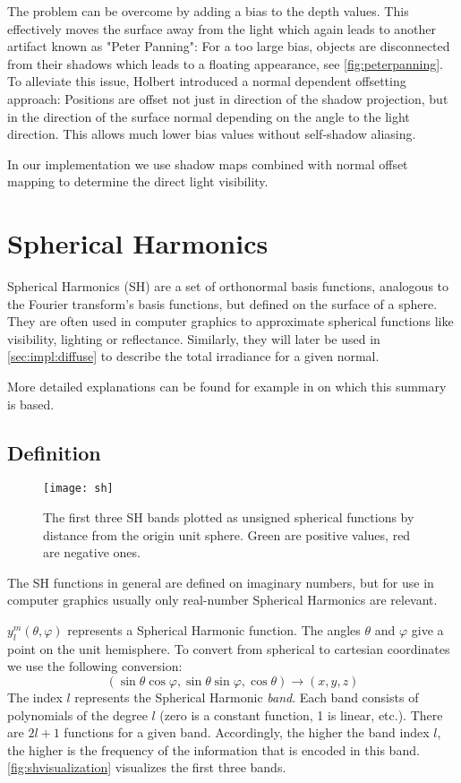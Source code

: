 \documentclass[thesis.tex]{subfiles}
\begin{document}
The problem can be overcome by adding a bias to the depth values.
This effectively moves the surface away from the light which again leads to another artifact known as "Peter Panning":
For a too large bias, objects are disconnected from their shadows which leads to a floating appearance, see \autoref{fig:peterpanning}.
\\
To alleviate this issue, Holbert \cite{bib:normaloffsetshadowmapping} introduced a normal dependent offsetting approach:
Positions are offset not just in direction of the shadow projection, but in the direction of the surface normal depending on the angle to the light direction.
This allows much lower bias values without self-shadow aliasing.

In our implementation we use shadow maps combined with normal offset mapping to determine the direct light visibility.


\section{Spherical Harmonics}\label{sec:preq:sh}
Spherical Harmonics (SH) are a set of orthonormal basis functions, analogous to the Fourier transform's basis functions, but defined on the surface of a sphere.
They are often used in computer graphics to approximate spherical functions like visibility, lighting or reflectance. Similarly, they will later be used in \autoref{sec:impl:diffuse} to describe the total irradiance for a given normal.

More detailed explanations can be found for example in \cite{bib:grittysh, bib:stupidsh} on which this summary is based.

\subsection{Definition} \label{chap:sh:def}
\begin{figure}[h]
	\centering
	\texttt{[image: sh]}
	\caption{\cite{bib:grittysh} The first three SH bands plotted as unsigned spherical functions by distance from the origin unit sphere. Green are positive values, red are negative ones.}
	\label{fig:shvisualization}
\end{figure}
The SH functions in general are defined on imaginary numbers, but for use in computer graphics usually only real-number Spherical Harmonics are relevant.

$y^m_l(\theta, \varphi)$ represents a Spherical Harmonic function.
The angles $\theta$ and $\varphi$ give a point on the unit hemisphere.
To convert from spherical to cartesian coordinates we use the following conversion:
\begin{equation} \label{equ:postoangle}
(\sin\theta\cos\varphi, \sin\theta\sin\varphi, \cos\theta) \rightarrow (x,y,z)
\end{equation}
The index $l$ represents the Spherical Harmonic \emph{band}.
Each band consists of polynomials of the degree $l$ (zero is a constant function, 1 is linear, etc.).
There are $2l+1$ functions for a given band.
Accordingly, the higher the band index $l$, the higher is the frequency of the information that is encoded in this band.
\autoref{fig:shvisualization} visualizes the first three bands.
\end{document}
